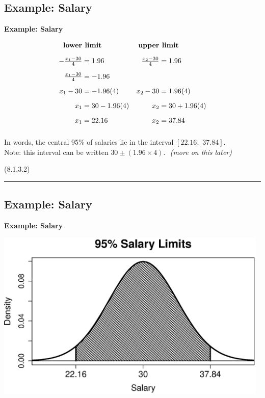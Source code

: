 \documentclass[compress]{beamer}        %
\makeatletter
\newcommand{\tcb}{\textcolor{beamer@blendedblue}}
\makeatother
\begin{document}
\subsection{Example: Salary}
\begin{frame}{\bf \tcb{Example: Salary\\[-1.1cm]}}\label{salary95int}

\begin{align*}
\text{{\bf lower}}&\text{{\bf \,\,limit}}  & \text{{\bf upper}}&\text{{\bf \,\,limit}} \\[0.2cm]
-\tfrac{x_1-30}{4} &= 1.96 & \tfrac{x_2-30}{4} &= 1.96 \\[0.2cm]
\tfrac{x_1-30}{4} &= -1.96 && \\[0.2cm]
x_1-30 &= -1.96(4) & x_2-30 &= 1.96(4) \\[0.2cm]
x_1 &= 30 - 1.96(4) & x_2 &= 30 + 1.96(4) \\[0.2cm]
x_1 &= 22.16 & x_2 &= 37.84 \\[0.2cm]
\end{align*}

In words, the central 95\% of salaries lie in the interval $[22.16,\,\, 37.84]$.\\[0.5cm]

Note: this interval can be written $30 \pm (1.96\times4)$. \,\,\emph{(more on this later)}

\begin{textblock}{1}(8.1,3.2)
\xymatrixcolsep{0.8cm}
\rule{1pt}{5cm}
\end{textblock}

\end{frame}


\subsection{Example: Salary}
\begin{frame}{\bf \tcb{Example: Salary}}

\begin{center}
\includegraphics[width=0.98\textwidth, trim = 0.0cm 0.5cm 0.3cm 0.5cm, clip]{Norm95Salary}
\end{center}

\end{frame}
\end{document}
